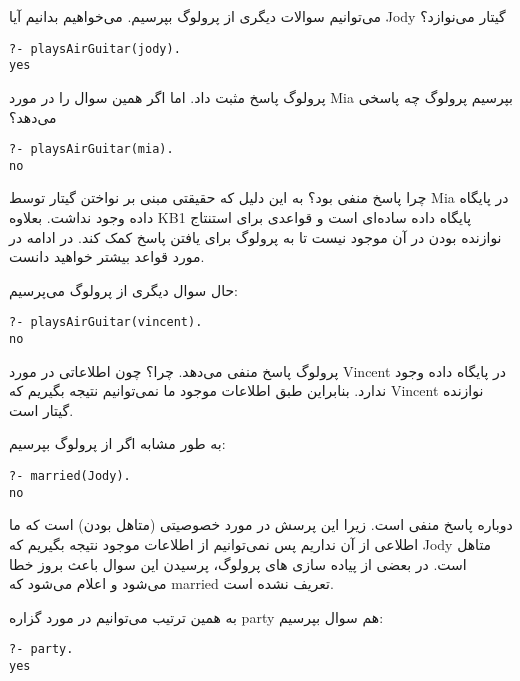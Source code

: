 می‌توانیم سوالات دیگری از ‌‌پرولوگ بپرسیم. می‌خواهیم بدانیم آیا Jody گیتار می‌نوازد؟

\begin{latin}
\begin{lstlisting}
?- playsAirGuitar(jody).
yes
\end{lstlisting}
\end{latin}

پرولوگ پاسخ مثبت داد. اما اگر همین سوال را در مورد Mia بپرسیم پرولوگ چه پاسخی می‌دهد؟

\begin{latin}
\begin{lstlisting}
?- playsAirGuitar(mia).
no
\end{lstlisting}
\end{latin}

چرا پاسخ منفی بود؟ به این دلیل که حقیقتی مبنی بر نواختن گیتار توسط Mia در پایگاه داده وجود نداشت. بعلاوه KB1 پایگاه داده ساده‌ای است و قواعدی برای استنتاج نوازنده بودن در آن موجود نیست تا به پرولوگ برای یافتن پاسخ کمک کند. در ادامه در مورد قواعد بیشتر خواهید دانست.

حال سوال دیگری از پرولوگ می‌پرسیم:

\begin{latin}
\begin{lstlisting}
?- playsAirGuitar(vincent).
no
\end{lstlisting}
\end{latin}

پرولوگ پاسخ منفی می‌دهد. چرا؟ چون اطلاعاتی در مورد Vincent در پایگاه داده وجود ندارد. بنابراین طبق اطلاعات موجود ما نمی‌توانیم نتیجه بگیریم که Vincent نوازنده گیتار است.

به طور مشابه اگر از پرولوگ بپرسیم:

\begin{latin}
\begin{lstlisting}
?- married(Jody).
no
\end{lstlisting}
\end{latin}

دوباره پاسخ منفی است. زیرا این پرسش در مورد خصوصیتی (متاهل بودن) است که ما اطلاعی از آن نداریم پس نمی‌توانیم از اطلاعات موجود نتیجه بگیریم که Jody متاهل است. در بعضی از پیاده سازی های پرولوگ، پرسیدن این سوال باعث بروز خطا می‌شود و اعلام می‌شود که married تعریف نشده است.

به همین ترتیب می‌توانیم در مورد گزاره party هم سوال بپرسیم:

\begin{latin}
\begin{lstlisting}
?- party.
yes
\end{lstlisting}
\end{latin}

